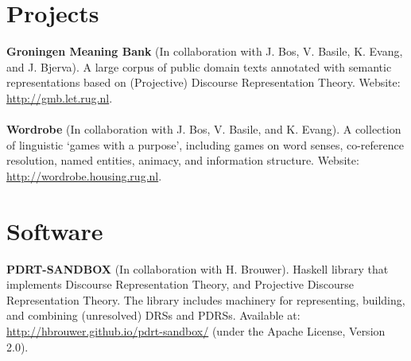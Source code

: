 \documentclass[a4paper,10pt]{article}
\def\leftcolwidth{.12\textwidth}
\begin{document}
\section*{Projects}

\noindent
    \textbf{Groningen Meaning Bank} (In collaboration with J. Bos, V. Basile,
    K. Evang, and J. Bjerva). A large corpus of public domain texts annotated
    with semantic representations based on (Projective) Discourse Representation
    Theory. Website: \url{http://gmb.let.rug.nl}.\\
    \\
    \textbf{Wordrobe} (In collaboration with J. Bos, V. Basile, and
    K. Evang). A collection of linguistic `games with a purpose', including
    games on word senses, co-reference resolution, named entities, animacy, and
    information structure. Website: \url{http://wordrobe.housing.rug.nl}.


\section*{Software}

\noindent
\textbf{PDRT-SANDBOX} (In collaboration with H. Brouwer). Haskell library that
    implements Discourse Representation Theory, and Projective Discourse
    Representation Theory. The library includes machinery for representing,
    building, and combining (unresolved) DRSs and PDRSs.
    Available at: \url{http://hbrouwer.github.io/pdrt-sandbox/} (under the
    Apache License, Version 2.0).




%
\end{document}
